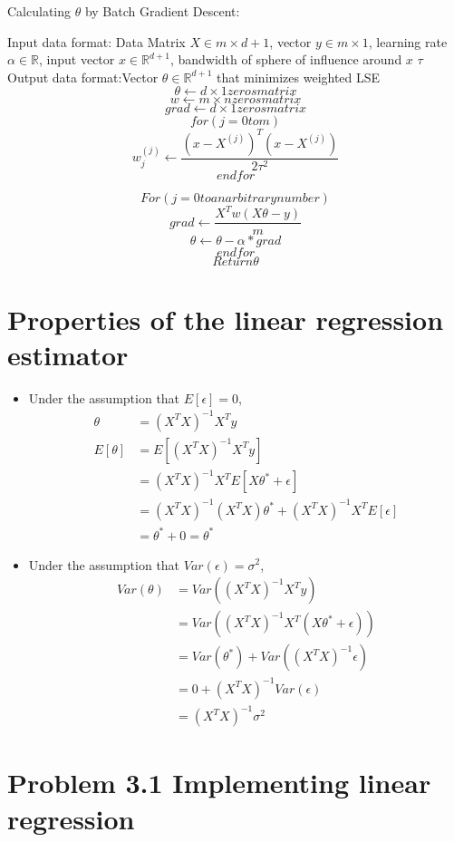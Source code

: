 \documentclass[pdftex,11pt]{article}
\begin{document}
\begin{itemize}
Calculating $\theta$ by Batch Gradient Descent:
 


Input data format: Data Matrix $X \in m\times d+1$, vector $y\in m\times 1$, learning rate $\alpha\in \mathbb{R}$, input vector $x\in\mathbb{R}^{d+1}$, bandwidth of sphere of influence around $x$ $\tau$\\
Output data format:Vector $\theta\in\mathbb{R}^{d+1}$ that minimizes weighted LSE\\

$$\theta\gets d\times 1 zeros matrix$$ 
$$w\gets m\times n zeros matrix$$ 
$$grad\gets d\times 1 zeros matrix$$ 
$$for (j=0 to m)$$
$$w_j^{(j)}\gets\frac{(x-X^{(j)})^T(x-X^{(j)})}{2\tau^2}$$
$$end for $$

$$For(j=0 to an arbitrary number)$$
$$grad\gets\frac{X^Tw(X\theta-y)}{m}$$
 $$\theta\gets\theta-\alpha*grad$$
 $$end for $$
 $$ Return\theta$$
\end{itemize}
\section{Properties of the linear regression estimator}
\begin{itemize}
\item Under the assumption that $E[\epsilon]=0$,
	\begin{align*}
		\theta&=(X^TX)^{-1}X^Ty\\
		E[\theta]&=E[(X^TX)^{-1}X^Ty]\\
		&=(X^TX)^{-1}X^TE[X\theta^*+\epsilon]\\
		&=(X^TX)^{-1}(X^TX)\theta^*+(X^TX)^{-1}X^TE[\epsilon]\\
		&=\theta^*+0=\theta^*
	\end{align*}
\item Under the assumption that $Var(\epsilon)=\sigma^2$,
	\begin{align*}
		Var(\theta)&=Var((X^TX)^{-1}X^Ty)\\
		&=Var((X^TX)^{-1}X^T(X\theta^*+\epsilon))\\
		&=Var(\theta^*)+Var((X^TX)^{-1}\epsilon)\\
		&=0+(X^TX)^{-1}Var(\epsilon)\\
		&=(X^TX)^{-1}\sigma^2
	\end{align*}
\end{itemize}

\section{Problem 3.1 Implementing linear regression}
\end{document}
